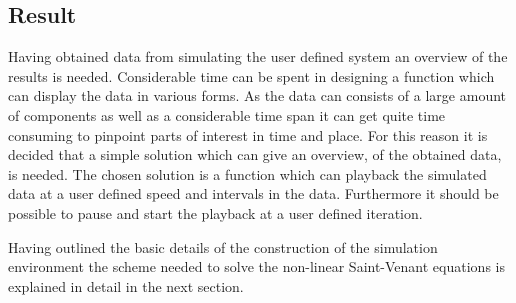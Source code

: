 \subsection*{Result}

Having obtained data from simulating the user defined system an overview of the results is needed. Considerable time can be spent in designing a function which can display the data in various forms. As the data can consists of a large amount of components as well as a considerable time span it can get quite time consuming to pinpoint parts of interest in time and place. For this reason it is decided that a simple solution which can give an overview, of the obtained data, is needed. The chosen solution is a function which can playback the simulated data at a user defined speed and intervals in the data. Furthermore it should be possible to pause and start the playback at a user defined iteration.    




Having outlined the basic details of the construction of the simulation environment the scheme needed to solve the non-linear Saint-Venant equations is explained in detail in the next section.   